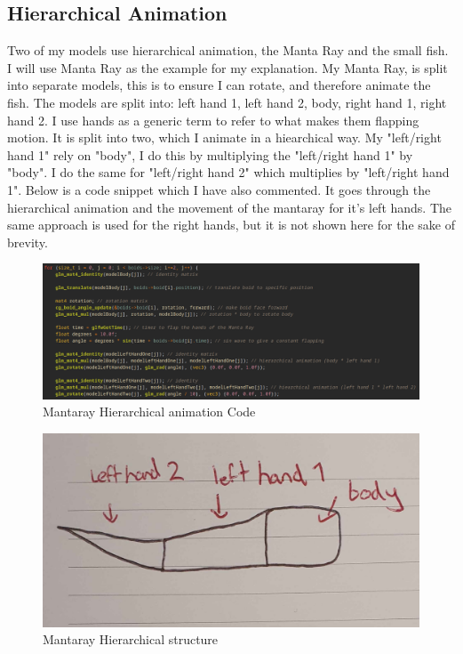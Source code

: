 \documentclass[a4paper, 10pt]{article}
\begin{document}
\newpage
\subsection{Hierarchical Animation}
Two of my models use hierarchical animation, the Manta Ray and the small fish. I will use Manta Ray as the example for my explanation.
My Manta Ray, is split into separate models, this is to ensure I can rotate, and therefore animate the fish. The models are split into:
left hand 1, left hand 2, body, right hand 1, right hand 2. I use hands as a generic term to refer to what makes them flapping motion. It is split
into two, which I animate in a hiearchical way. My "left/right hand 1" rely on "body", I do this by multiplying the "left/right hand 1" by "body". I do the same
for "left/right hand 2" which multiplies by "left/right hand 1". Below is a code snippet which I have also commented. It goes through the hierarchical animation
and the movement of the mantaray for it's left hands. The same approach is used for the right hands, but it is not shown here for the sake of brevity.

\begin{figure}[h]
    \centering
    \includegraphics[scale=0.5]{images/mantaray-hanim}
    \caption{Mantaray Hierarchical animation Code}
    \label{fig:mantaray-animation}
\end{figure}

\begin{figure}[h]
    \centering
    \includegraphics[scale=0.2]{images/mantaray-anim}
    \caption{Mantaray Hierarchical structure}
    \label{fig:mantaray-animation}
\end{figure}
\end{document}
